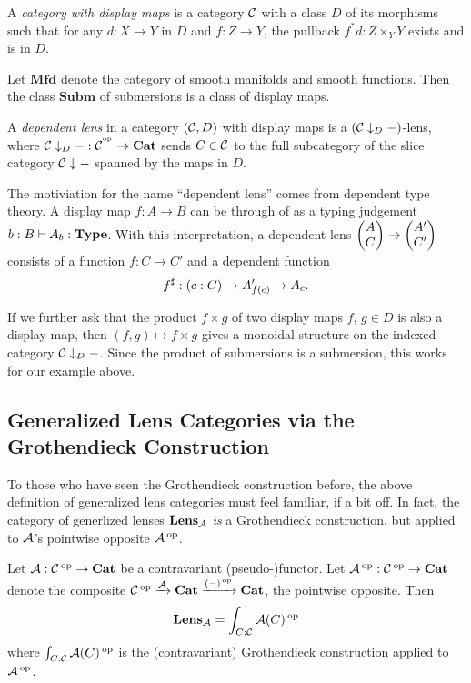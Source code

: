 \begin{defn}
A \emph{category with display maps} is a category $\operatorname{\mathcal{C}}$ with a class $D$ of its
morphisms such that for any $d : X \to Y$ in $D$ and $f : Z \to Y$, the pullback
$f^{\ast}d : Z \times_Y Y$ exists and is in $D$.
\end{defn}

\begin{ex}
Let $\textbf{Mfd}$ denote the category of smooth manifolds and smooth functions.
Then the class $\textbf{Subm}$ of submersions is a class of display maps.
\end{ex}

\begin{defn}
A \emph{dependent lens} in a category $(\operatorname{\mathcal{C}}, D)$ with display maps is a $(\operatorname{\mathcal{C}}
\downarrow_{D} -)$-lens, where $\operatorname{\mathcal{C}} \downarrow_D - : \operatorname{\mathcal{C}}^{\operatorname{^\text{op}}} \to \textbf{Cat}$ sends $C
\in \operatorname{\mathcal{C}}$ to the full subcategory of the slice category $\operatorname{\mathcal{C}} \downarrow -$
spanned by the maps in $D$.
\end{defn}

\begin{rmk}
The motiviation for the name ``dependent lens'' comes from dependent type
theory. A display map $f : A \to B$ can be through of as a typing judgement $b : B
\vdash A_b : \operatorname{\textbf{Type}}$. With this interpretation, a dependent lens $\begin{pmatrix}{A} \\ {C} \end{pmatrix} \to
\begin{pmatrix}{A'} \\ {C'} \end{pmatrix}$ consists of a function $f : C \to C'$ and a dependent function 
$$f^{\sharp} : ({c : C}) \to A'_{f(c)} \to A_c.$$

\end{rmk}

If we further ask that the product $f \times g$ of two display maps $f,\, g \in
D$ is also a display map, then $(f, g) \mapsto f \times g$ gives a monoidal
structure on the indexed category $\operatorname{\mathcal{C}} \downarrow_D -$. Since the product of
submersions is a submersion, this works for our example above.
\subsection{Generalized Lens Categories via the Grothendieck Construction}

To those who have seen the Grothendieck construction before, the above
definition of generalized lens categories must feel familiar, if a bit off. In
fact, the category of generlized lenses $\textbf{Lens}_{\operatorname{\mathcal{A}}}$ \emph{is} a
Grothendieck construction, but applied to $\operatorname{\mathcal{A}}$'s pointwise opposite $\operatorname{\mathcal{A}}\operatorname{^\text{op}}$.
\begin{prop}
Let $\operatorname{\mathcal{A}} : \operatorname{\mathcal{C}}\operatorname{^\text{op}} \to \textbf{Cat}$ be a contravariant (pseudo-)functor. Let
$\operatorname{\mathcal{A}}\operatorname{^\text{op}} : \operatorname{\mathcal{C}}\operatorname{^\text{op}} \to \textbf{Cat}$ denote the composite $\operatorname{\mathcal{C}}\operatorname{^\text{op}} \xrightarrow{\operatorname{\mathcal{A}}}
\textbf{Cat} \xrightarrow{(-)\operatorname{^\text{op}}} \textbf{Cat}$, the pointwise opposite. Then
$$\textbf{Lens}_{\operatorname{\mathcal{A}}} = \int_{C : \operatorname{\mathcal{C}}} \operatorname{\mathcal{A}}(C)\operatorname{^\text{op}}$$
where $\int_{C : \operatorname{\mathcal{C}}} \operatorname{\mathcal{A}}(C)\operatorname{^\text{op}}$ is the (contravariant) Grothendieck construction applied to
$\operatorname{\mathcal{A}}\operatorname{^\text{op}}$.
\end{prop}

